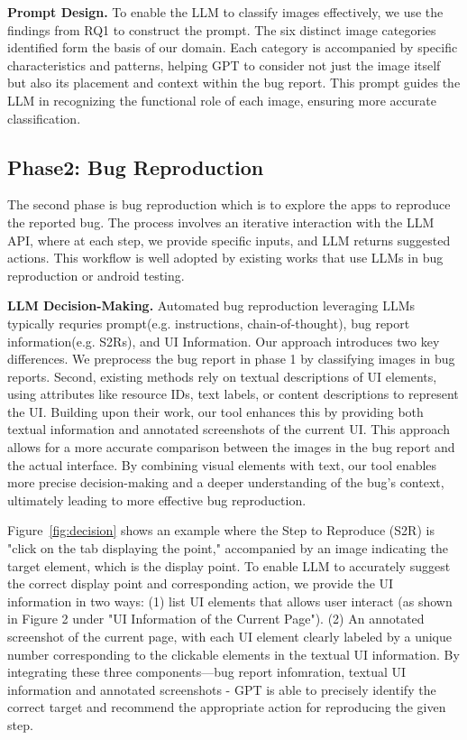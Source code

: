 \textbf{Prompt Design.} To enable the LLM to classify images effectively, we use the findings from RQ1 to construct the prompt. The six distinct image categories identified form the basis of our domain. Each category is accompanied by specific characteristics and patterns, helping GPT to consider not just the image itself but also its placement and context within the bug report. This prompt guides the LLM in recognizing the functional role of each image, ensuring more accurate classification.


\subsection{Phase2: Bug Reproduction}
The second phase is bug reproduction which is to explore the apps to reproduce the reported bug.
The process involves an iterative interaction with the LLM API, where at each step, we provide specific inputs, and LLM returns suggested actions.
This workflow is well adopted by existing works that use LLMs in bug reproduction or android testing.


\textbf{LLM Decision-Making.} Automated bug reproduction leveraging LLMs typically requries prompt(e.g. instructions, chain-of-thought), bug report information(e.g. S2Rs), and UI Information. Our approach introduces two key differences. We preprocess the bug report in phase 1 by classifying images in bug reports. 
%
Second, existing methods rely on textual descriptions of UI elements, using attributes like resource IDs, text labels, or content descriptions to represent the UI. Building upon their work, our tool enhances this by providing both textual information and annotated screenshots of the current UI. This approach allows for a more accurate comparison between the images in the bug report and the actual interface. By combining visual elements with text, our tool enables more precise decision-making and a deeper understanding of the bug's context, ultimately leading to more effective bug reproduction.

Figure~\ref{fig:decision} shows an example where the Step to Reproduce (S2R) is "click on the tab displaying the point," accompanied by an image indicating the target element, which is the display point. To enable LLM to accurately suggest the correct display point and corresponding action, we provide the UI information in two ways: (1) list UI elements that allows user interact (as shown in Figure 2 under "UI Information of the Current Page"). (2) An annotated screenshot of the current page,  with each UI element clearly labeled by a unique number corresponding to the clickable elements in the textual UI information. By integrating these three components—bug report infomration, textual UI information and annotated screenshots - GPT is able to precisely identify the correct target and recommend the appropriate action for reproducing the given step.
 




